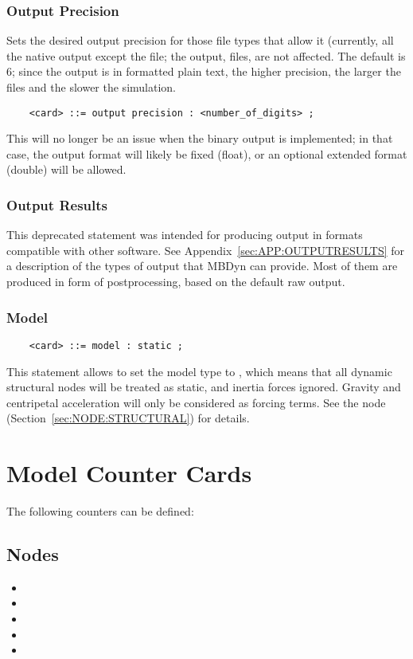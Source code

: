 \subsubsection{Output Precision}
Sets the desired output precision for those file types that allow it
(currently, all the native output except the  file; the
 output,  files, are not affected.
The default is 6; since the output is in formatted plain text, the higher
precision, the larger the files and the slower the simulation.
\begin{verbatim}
    <card> ::= output precision : <number_of_digits> ;
\end{verbatim}
This will no longer be an issue when the binary output is implemented;
in that case, the output format will likely be fixed (float), or
an optional extended format (double) will be allowed.

\subsubsection{Output Results}
This deprecated statement was intended for producing output in formats
compatible with other software.
See Appendix~\ref{sec:APP:OUTPUTRESULTS} for a description of the types
of output that MBDyn can provide.
Most of them are produced in form of postprocessing, based on the default
raw output.

\subsubsection{Model}
\begin{verbatim}
    <card> ::= model : static ;
\end{verbatim}
This statement allows to set the model type to , which means
that all dynamic structural nodes will be treated as static, and inertia
forces ignored.
Gravity and centripetal acceleration will only be considered as forcing
terms.
See the  node (Section~\ref{sec:NODE:STRUCTURAL}) for details.


\section{Model Counter Cards}
The following counters can be defined:
\subsection{Nodes}
\begin{itemize}
\item {}
\item {}
\item {}
\item {}
\item {}
\end{itemize}

